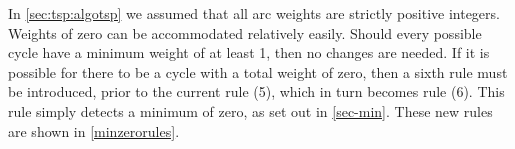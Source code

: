 
In \autoref{sec:tsp:algotsp} we assumed that all arc weights are strictly positive integers.  Weights of zero can be accommodated relatively easily.  Should every possible cycle have a minimum weight of at least 1, then no changes are needed.  If it is possible for there to be a cycle with a total weight of zero, then a sixth rule must be introduced, prior to the current rule (5), which in turn becomes rule (6).  This rule simply detects a minimum of zero, as set out in \autoref{sec-min}.  These new rules are shown in \autoref{minzerorules}.%


